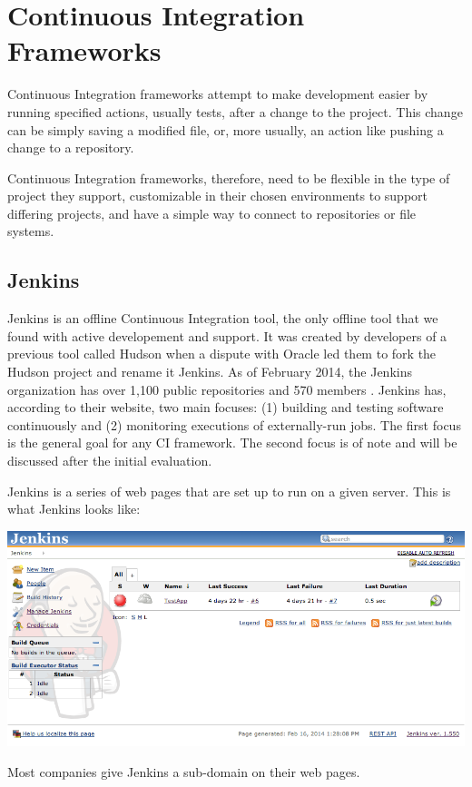 \documentclass[12pt]{ucthesis}
\newenvironment{Figure}
  {\par\medskip\noindent\minipage{\linewidth}}
  {\endminipage\par\medskip}
\begin{document}
\section{Continuous Integration Frameworks}
Continuous Integration frameworks attempt to make development easier by running specified actions, usually tests, after a change to the project. This change can be simply saving a modified file, or, more usually, an action like pushing a change to a repository.

Continuous Integration frameworks, therefore, need to be flexible in the type of project they support, customizable in their chosen environments to support differing projects, and have a simple way to connect to repositories or file systems.

\subsection{Jenkins}
Jenkins \cite{Jenkins} is an offline Continuous Integration tool, the only offline tool that we found with active developement and support. It was created by developers of a previous tool called Hudson when a dispute with Oracle led them to fork the Hudson project and rename it Jenkins. As of February 2014, the Jenkins organization has over 1,100 public repositories and 570 members \cite{JenkinsGitHub}. Jenkins has, according to their website, two main focuses: (1) building and testing software continuously and (2) monitoring executions of externally-run jobs. The first focus is the general goal for any CI framework. The second focus is of note and will be discussed after the initial evaluation. 

Jenkins is a series of web pages that are set up to run on a given server. This is what Jenkins looks like:
\begin{Figure}
  \centering
  \includegraphics[width=0.95\linewidth]{jenkins.png}
\end{Figure}
Most companies give Jenkins a sub-domain on their web pages.
\end{document}
